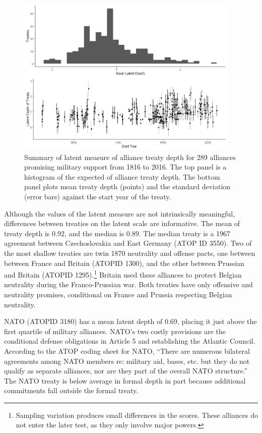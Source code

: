 \documentclass[12pt]{article}
\begin{document}
\begin{figure}
	\centering
		\includegraphics[width=0.95\textwidth]{../figures/ld-summary.png}
	\caption{Summary of latent measure of alliance treaty depth for 289 alliances promising military support from 1816 to 2016. The top panel is a histogram of the expected of alliance treaty depth. The bottom panel plots mean treaty depth (points) and the standard deviation (error bars) against the start year of the treaty.}
	\label{fig:ld-summary}
\end{figure}


Although the values of the latent measure are not intrinsically meaningful, differences between treaties on the latent scale are informative. 
The mean of treaty depth is 0.92, and the median is 0.89. 
The median treaty is a 1967 agreement between Czechoslovakia and East Germany (ATOP ID 3550). 
Two of the most shallow treaties are twin 1870 neutrality and offense pacts, one between between France and Britain (ATOPID 1300), and the other between Prussian and Britain (ATOPID 1295).\footnote{
Sampling variation produces small differences in the scores. These alliances do not enter the later test, as they only involve major powers.} 
Britain used these alliances to protect Belgian neutrality during the Franco-Prussian war.  
Both treaties have only offensive and neutrality promises, conditional on France and Prussia respecting Belgian neutrality. 


NATO (ATOPID 3180) has a mean latent depth of 0.69, placing it just above the first quartile of military alliances. 
NATO's two costly provisions are the conditional defense obligations in Article 5 and establishing the Atlantic Council. 
According to the ATOP coding sheet for NATO, ``There are numerous bilateral agreements among NATO members re: military aid, bases, etc. but they do not qualify as separate alliances, nor are they part of the overall NATO structure.''
The NATO treaty is below average in formal depth in part because additional commitments fall outside the formal treaty.    
\end{document}
